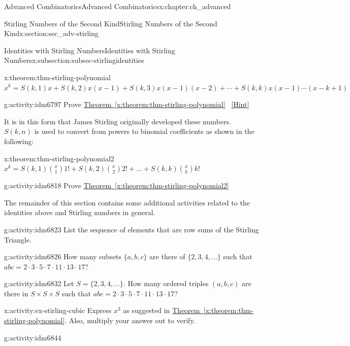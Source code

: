 \documentclass[oneside,10pt,]{book}
\numberwithin{equation}{chapter}
\begin{document}
\begin{chapterptx}{Advanced Combinatorics}{}{Advanced Combinatorics}{}{}{x:chapter:ch_advanced}
\begin{sectionptx}{Stirling Numbers of the Second Kind}{}{Stirling Numbers of the Second Kind}{}{}{x:section:sec_adv-stirling}
\begin{subsectionptx}{Identities with Stirling Numbers}{}{Identities with Stirling Numbers}{}{}{x:subsection:subsec-stirlingidentities}
\begin{theorem}{}{}{x:theorem:thm-stirling-polynomial}%
\(x^{k} = S\left(k,1 \right)x + S\left(k,2 \right)x\left( x - 1 \right) + S\left(k,3 \right)x\left( x - 1 \right)\left( x - 2 \right) + \cdots
+ S\left(k,k \right)x\left( x - 1 \right)\cdots(x -k + 1)\)%
\end{theorem}
\begin{activity}{}{g:activity:idm6797}%
Prove \hyperref[x:theorem:thm-stirling-polynomial]{Theorem~\ref{x:theorem:thm-stirling-polynomial}}%
\qquad~\hfill{\tiny\hyperlink{g:hint:idm6801-back}{[Hint]}}\end{activity}
It is in this form that James Stirling originally developed these numbers. \(S(k,n)\) is used to convert from powers to binomial  coefficients as shown in the following:%
\begin{theorem}{}{}{x:theorem:thm-stirling-polynomial2}%
\(x^{k} = S\left(k,1 \right)\binom{x}{1}1! + S\left(k,2 \right) \binom{x}{2}2! + \ldots + S\left(k,k \right)\binom{x}{k} k!\)%
\end{theorem}
\begin{activity}{}{g:activity:idm6818}%
Prove \hyperref[x:theorem:thm-stirling-polynomial2]{Theorem~\ref{x:theorem:thm-stirling-polynomial2}}%
\end{activity}
The remainder of this section contains some additional activities related to the identities above and Stirling numbers in general.%
\begin{activity}{}{g:activity:idm6823}%
List the sequence of elements that are row sums of the Stirling Triangle.%
\end{activity}
\begin{activity}{}{g:activity:idm6826}%
How many subsets \(\{a,b,c\}\) are there of \(\{2,3,4,\ldots\}\) such that \(abc = 2 \cdot 3 \cdot 5 \cdot 7 \cdot 11 \cdot 13 \cdot 17\)?%
\end{activity}
\begin{activity}{}{g:activity:idm6832}%
Let \(S = \{2,3,4,\ldots\}\).  How many ordered triples \((a,b,c)\) are there in \(S\times S \times S\) such that \(abc = 2 \cdot 3 \cdot 5 \cdot 7 \cdot 11 \cdot 13 \cdot 17\)?%
\end{activity}
\begin{activity}{}{x:activity:ex-stirling-cubic}%
Express \(x^3\) as suggested in \hyperref[x:theorem:thm-stirling-polynomial]{Theorem~\ref{x:theorem:thm-stirling-polynomial}}.  Also, multiply your answer out to verify.%
\end{activity}
\begin{activity}{}{g:activity:idm6844}%

\end{activity}
\end{subsectionptx}
\end{sectionptx}
\end{chapterptx}
\end{document}
